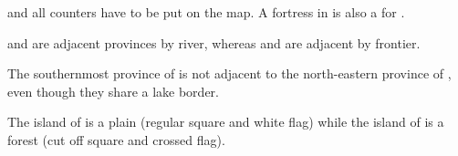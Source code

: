 and all counters have to be put on the \ROTW map. A fortress in \provinceOrmus
is also a \Presidio for \provinceBam.
\begin{exemple}
  \provinceNormandie and \provinceCaux are adjacent provinces by river,
  whereas \provinceNormandie and \provinceMaine are adjacent by frontier.

%
  The southernmost province of  is not adjacent to
  the north-eastern province of \granderegionIllinois, even though they share
  a lake border.

  The island of  is a plain (regular square and
  white flag) while the island of \provinceGuadeloupe is a forest (cut off
  square and crossed flag).
\end{exemple}


